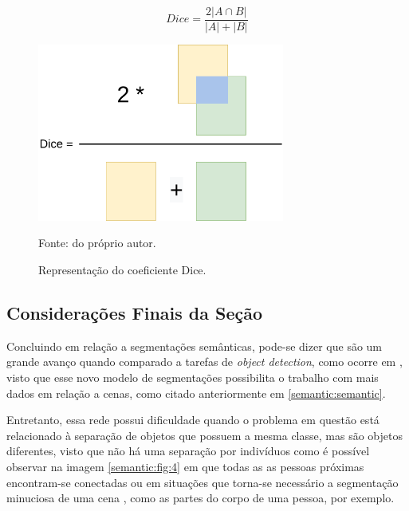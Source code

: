 \begin{equation}
    \label{semantic:eq:6}
    Dice = \frac{2|A \cap B|}{|A| + |B|}
\end{equation}

\begin{figure}[H]
    \centering
    \caption{Representação do coeficiente Dice.}
    \includegraphics[height=2.3in]{recursos/imagens/semantic/dice.png}
    \label{semantic:fig:2}

    \vspace*{1 cm}
    Fonte: do próprio autor.
\end{figure}


\subsection{Considerações Finais da Seção}
\label{semantic:conclusion}

Concluindo em relação a segmentações semânticas, pode-se dizer que são um grande avanço quando comparado a tarefas de \textit{object detection}, como ocorre em \cite{Vaillant1994}, visto que esse novo modelo de segmentações possibilita o trabalho com mais dados em relação a cenas, como citado anteriormente em \ref{semantic:semantic}.

Entretanto, essa rede possui dificuldade quando o problema em questão está relacionado à separação de objetos que possuem a mesma classe, mas são objetos diferentes, visto que não há uma separação por indivíduos \cite{Kirillov2019a} como é possível observar na imagem \ref{semantic:fig:4} em que todas as as pessoas próximas encontram-se conectadas ou em situações que torna-se necessário a segmentação minuciosa de uma cena \cite{Ghosh2019}, como as partes do corpo de uma pessoa, por exemplo.

